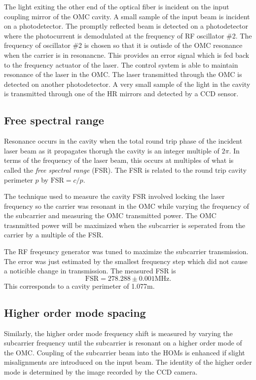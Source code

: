 The light exiting the other end of the optical fiber is incident on the input coupling mirror of the OMC cavity. %
A small sample of the input beam is incident on a photodetector. %
The promptly reflected beam is detected on a photodetector where the photocurrent is demodulated at the frequency of RF oscillator \#2. %
The frequency of oscillator \#2 is chosen so that it is outisde of the OMC resonance when the carrier is in resonancne. %
This provides an error signal which is fed back to the frequency actuator of the laser. %
The control system is able to maintain resonance of the laser in the OMC. %
The laser transmitted through the OMC is detected on another photodetector. %
A very small sample of the light in the cavity is transmitted through one of the HR mirrors and detected by a CCD sensor.

\subsection{Free spectral range}
Resonance occurs in the cavity when the total round trip phase of the incident laser beam as it propagates thorugh the cavity is an integer multiple of $2\pi$. %
In terms of the frequency of the laser beam, this occurs at multiples of what is called the \emph{free spectral range} (FSR). %
The FSR is related to the round trip cavity perimeter $p$ by $\mathrm{FSR}=c/p$.

The technique used to measure the cavity FSR involved locking the laser frequency so the carrier was resonant in the OMC while varying the frequency of the subcarrier and measuring the OMC transmitted power. %
The OMC trasnmitted power will be maximized when the subcarrier is seperated from the carrier by a multiple of the FSR.

The RF freqeuncy generator was tuned to maximize the subcarrier transmission. %
The error was just estimated by the smallest frequency step which did not cause a noticible change in transmission. %
The measured FSR is
\begin{equation}
\mathrm{FSR}=278.288\pm0.001\text{MHz}.
\end{equation}
This corresponds to a cavity perimeter of 1.077m.

\subsection{Higher order mode spacing}
Similarly, the higher order mode frequency shift is measured by varying the subcarrier frequency until the subcarrier is resonant on a higher order mode of the OMC. %
Coupling of the subcarrier beam into the HOMs is enhanced if slight misalignments are introduced on the input beam. %
The identity of the higher order mode is determined by the image recorded by the CCD camera.

